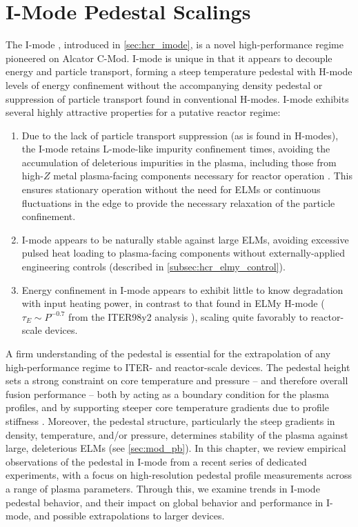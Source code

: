 \chapter{I-Mode Pedestal Scalings}\label{ch:ImodePedestal}

The I-mode \cite{Whyte2010,Hubbard2011}, introduced in \cref{sec:hcr_imode}, is a novel high-performance regime pioneered on Alcator C-Mod.  I-mode is unique in that it appears to decouple energy and particle transport, forming a steep temperature pedestal with H-mode levels of energy confinement without the accompanying density pedestal or suppression of particle transport found in conventional H-modes.  I-mode exhibits several highly attractive properties for a putative reactor regime:

\begin{enumerate}
 \item Due to the lack of particle transport suppression (as is found in H-modes), the I-mode retains L-mode-like impurity confinement times, avoiding the accumulation of deleterious impurities in the plasma, including those from high-$Z$ metal plasma-facing components necessary for reactor operation \cite{Loarte2007}.  This ensures stationary operation without the need for ELMs or continuous fluctuations in the edge to provide the necessary relaxation of the particle confinement.
 \item I-mode appears to be naturally stable against large ELMs, avoiding excessive pulsed heat loading to plasma-facing components without externally-applied engineering controls (described in \cref{subsec:hcr_elmy_control}).
 \item Energy confinement in I-mode appears to exhibit little to know degradation with input heating power, in contrast to that found in ELMy H-mode ($\tau_E \sim P^{-0.7}$ from the ITER98y2 analysis \cite{ITER1999}), scaling quite favorably to reactor-scale devices.
\end{enumerate}

A firm understanding of the pedestal is essential for the extrapolation of any high-performance regime to ITER- and reactor-scale devices.  The pedestal height sets a strong constraint on core temperature and pressure -- and therefore overall fusion performance -- both by acting as a boundary condition for the plasma profiles, and by supporting steeper core temperature gradients due to profile stiffness \cite{Kinsey2011,Hubbard1998}.  Moreover, the pedestal structure, particularly the steep gradients in density, temperature, and/or pressure, determines stability of the plasma against large, deleterious ELMs (see \cref{sec:mod_pb}).  In this chapter, we review empirical observations of the pedestal in I-mode from a recent series of dedicated experiments, with a focus on high-resolution pedestal profile measurements across a range of plasma parameters.  Through this, we examine trends in I-mode pedestal behavior, and their impact on global behavior and performance in I-mode, and possible extrapolations to larger devices.\nicesectionending


